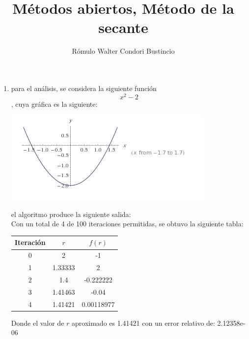 \documentclass[10pt]{article}
\title{M\'etodos abiertos, M\'etodo de la secante}
\author{R\'omulo Walter Condori Bustincio}
\date{}
\begin{document}
\maketitle
\begin{enumerate}
\item para el an\'alisis, se considera la siguiente funci\'on $$x^2- 2$$, cuya gr\'afica es la siguiente:
\begin{center}
 \includegraphics[scale=0.8]{./grafica.jpg}
\end{center}
el algoritmo produce la siguiente salida:\\

Con un total de 4 de 100 iteraciones permitidas, se obtuvo la siguiente tabla:
\begin{center}
\begin{tabular}{|c|c|c|}
\hline
Iteraci\'on&$r$&$f(r)$\\
\hline
0&2&-1\\
1&1.33333&2\\
2&1.4&-0.222222\\
3&1.41463&-0.04\\
4&1.41421&0.00118977\\
\hline
\end{tabular}
\end{center}
Donde el valor de $r$ aproximado es 1.41421 con un error relativo de: 2.12358e-06

\end{enumerate}
\end{document}
